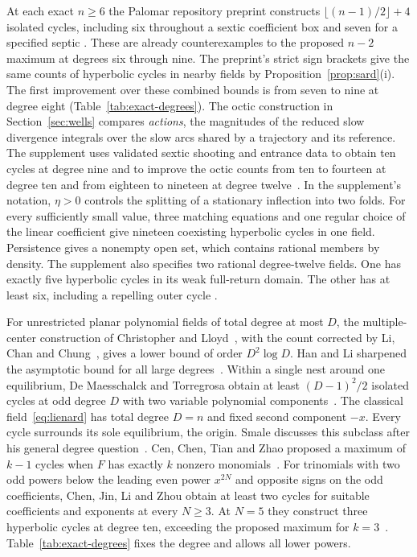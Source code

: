 \documentclass[11pt]{article}
\begin{document}
At each exact $n\ge6$ the Palomar repository preprint constructs
$\lfloor(n-1)/2\rfloor+4$ isolated cycles, including six throughout
a sextic coefficient box and seven for a specified septic
\cite[Theorems~1--2, Corollary~19 and Proposition~21]{Palomar2026}.
These are already counterexamples to the proposed $n-2$ maximum at
degrees six through nine. The preprint's strict sign brackets give
the same counts of hyperbolic cycles in nearby fields by
Proposition~\ref{prop:sard}(i). The first improvement over these
combined bounds is from seven to nine at degree eight
(Table~\ref{tab:exact-degrees}). The octic construction in
Section~\ref{sec:wells} compares \emph{actions}, the magnitudes of the
reduced slow divergence integrals over the slow arcs shared by a trajectory
and its reference.
The supplement uses validated sextic shooting and entrance data to
obtain ten cycles at degree nine and to improve the octic counts
from ten to fourteen at degree ten and from eighteen to nineteen at
degree twelve~\cite[\S\S S3--S5]{ElectronicSupplement}. In the supplement's
notation, $\eta>0$ controls the splitting of a stationary inflection into
two folds. For every sufficiently small value, three matching equations
and one regular choice of the linear coefficient give nineteen coexisting
hyperbolic cycles in one field. Persistence gives a nonempty open set,
which contains rational members by density. The supplement also specifies
two rational degree-twelve fields. One has exactly five hyperbolic cycles
in its weak full-return domain. The other has at least six, including a
repelling outer cycle
\cite[Remark~SA.1 and Proposition~SB.1]{ElectronicSupplement}.



For unrestricted planar polynomial fields of total degree at most $D$,
the multiple-center construction of Christopher and Lloyd~\cite[\S3]{CL1995},
with the count corrected by Li, Chan and Chung~\cite[Proposition~5]{LCC2002},
gives a lower bound of order $D^2\log D$. Han and Li sharpened the
asymptotic bound for all large degrees~\cite{HL2012}. Within a single nest
around one equilibrium, De Maesschalck and Torregrosa obtain at least
$(D-1)^2/2$ isolated cycles at odd degree $D$ with two variable polynomial
components~\cite[Theorems~1 and~4, system~(1)]{DMT2025}. The classical field~\eqref{eq:lienard}
has total degree $D=n$ and fixed second component $-x$. Every cycle
surrounds its sole equilibrium, the origin. Smale discusses
this subclass after his general degree question~\cite[Problem~13,
second version, (4)--(5)]{Smale1998}. Cen, Chen, Tian
and Zhao proposed a maximum of $k-1$ cycles when $F$ has exactly $k$
nonzero monomials~\cite{Cen2026}. For trinomials with two
odd powers below the leading even power $x^{2N}$ and opposite signs
on the odd coefficients, Chen, Jin, Li and Zhou obtain at least two
cycles for suitable coefficients and exponents at every $N\ge3$.
At $N=5$ they construct three hyperbolic cycles at degree ten, exceeding
the proposed maximum for $k=3$~\cite[Theorems~1.1--1.2 and \S3]{CJLZ2026}.
Table~\ref{tab:exact-degrees} fixes the degree and allows all lower powers.
\end{document}

